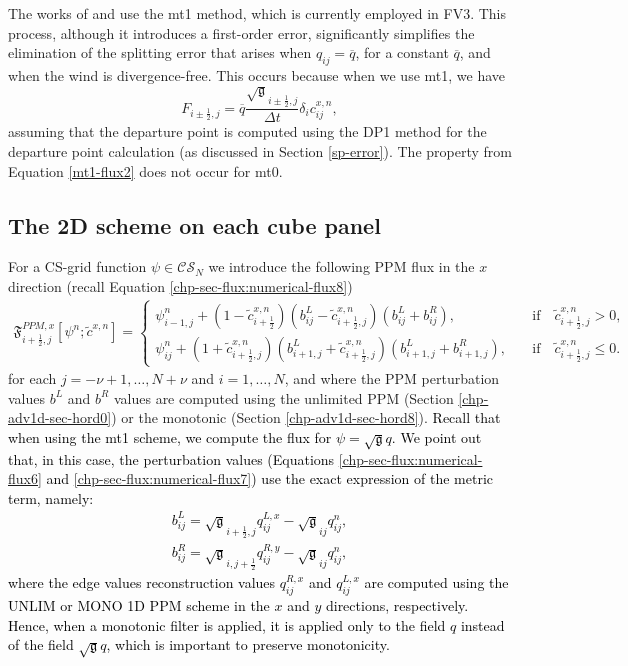The works of \citet{lin:2004} and \citet{putman:2007} use the mt1 method, which is currently employed in FV3.
This process, although it introduces a first-order error, 
significantly simplifies the elimination of the splitting error that arises when $q_{ij} = \overline{q}$, for a constant $\overline{q}$, 
and when the wind is divergence-free.
This occurs because when we use mt1, we have
\begin{equation}
	\label{mt1-flux2}
	{F}_{i\pm\frac{1}{2},j} =  \overline{q}\frac{\sqrt{\mathfrak{g}}_{i\pm\frac{1}{2},j}}{\Delta t}
	\delta_i c^{x,n}_{ij},
\end{equation}
assuming that the departure point is computed using the DP1 method for the departure point calculation (as discussed in Section \ref{sp-error}).
The property from Equation \eqref{mt1-flux2} does not occur for mt0.

\subsection{The 2D scheme on each cube panel}
\label{sec-splittingcs}
For a CS-grid function $\psi \in \mathcal{CS}_N$
we introduce the following PPM flux in the $x$ direction (recall Equation \eqref{chp-sec-flux:numerical-flux8})
\begin{align}
	\label{chp5-flux-xdir}
	\mathfrak{F}_{i+\frac{1}{2},j}^{PPM,x} [{{\psi}^n;\tilde{c}^{x,n}}]= %
	\begin{cases}
		{\psi}_{i-1,j}^{n}+(1-\tilde{c}_{i+\frac{1}{2}}^{x,n})
		(b^L_{ij}-\tilde{c}_{i+\frac{1}{2},j}^{x,n})
		(b^L_{ij}+b^R_{ij}),
		\quad &\text{if} \quad \tilde{c}_{i+\frac{1}{2},j}^{x,n}>0,\\
		{\psi}_{ij}^{n}+(1+\tilde{c}_{i+\frac{1}{2},j}^{x,n})
		(b^L_{i+1,j}+\tilde{c}_{i+\frac{1}{2},j}^{x,n})
		(b^L_{i+1,j}+b^R_{i+1,j}),
		\quad &\text{if} \quad \tilde{c}_{i+\frac{1}{2},j}^{x,n}\leq0.
	\end{cases}
\end{align}
for each $j=-\nu+1, \ldots, N+\nu$ and $i=1, \ldots, N$, and
where the PPM perturbation values $b^L$ and $b^R$ values are computed using the unlimited PPM (Section \ref{chp-adv1d-sec-hord0}) or the monotonic (Section \ref{chp-adv1d-sec-hord8}).
\textcolor{black}{
Recall that when using the mt1 scheme, we compute the flux for $\psi=\sqrt{\mathfrak{g}}q$.
We point out that, in this case, the perturbation values
(Equations \eqref{chp-sec-flux:numerical-flux6} and \eqref{chp-sec-flux:numerical-flux7})
use the exact expression of the metric term, namely:
\begin{align}
	\label{pert_left}
	b_{ij}^L = \sqrt{\mathfrak{g}}_{i+\frac{1}{2},j}q_{ij}^{L,x} - \sqrt{\mathfrak{g}}_{ij} q_{ij}^n, \\
	\label{pert_right}
	b_{ij}^R = \sqrt{\mathfrak{g}}_{i,j+\frac{1}{2}}q_{ij}^{R,y} - \sqrt{\mathfrak{g}}_{ij} q_{ij}^n, 
\end{align}
where the edge values reconstruction values $q_{ij}^{R,x}$ and $q_{ij}^{L,x}$
are computed using the UNLIM or MONO 1D PPM scheme in the $x$ and $y$ directions, respectively.
Hence, when a monotonic filter is applied, it is applied only to the field $q$ instead of the field $\sqrt{\mathfrak{g}}q$,
which is important to preserve monotonicity.
}

